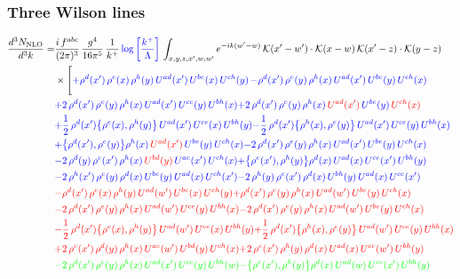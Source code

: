 \documentclass[9pt]{article}
\numberwithin{equation}{section}
\begin{document}
\subsubsection{Three Wilson lines}
\begin{align}
    \frac{d^{3}N_{\rm NLO}}{d^{3}k}= & \frac{i\,f^{abc}}{(2\pi)^{3}}\,\frac{g^{4}}{16\pi^{5}}\,\frac{1}{k^{+}}\,{\color{blue}\log{\left[\frac{k^{+}}{\Lambda}\right]}}\,\int_{x,y,z,x',w,w'}e^{-ik(w'-w)}\,\mathcal{K}(x'-w')\cdot\mathcal{K}(x-w)\,\mathcal{K}(x'-z)\cdot\mathcal{K}(y-z)\notag \\ & \times\Bigg[{\color{blue}+\rho^{d}(x')\,\rho^{e}(x)\,\rho^{h}(y)\,U^{ad}(x')\,U^{be}(x)\,U^{ch}(y)}\,{\color{blue}-\rho^{d}(x')\,\rho^{e}(y)\,\rho^{h}(x)\,U^{ad}(x')\,U^{be}(y)\,U^{ch}(x)}\notag \\ &{\color{blue}+2\,\rho^{d}(x')\,\rho^{e}(y)\,\rho^{h}(x)\,U^{ad}(x')\,U^{ce}(y)\,U^{bh}(x)}{\color{blue}+2\,\rho^{d}(x')\,\rho^{e}(y)\,\rho^{h}(x)\, {\color{red}U^{ad}(x')}\,U^{be}(y)\,{\color{red}U^{ch}(x)}}\notag \\ & {\color{blue}+\frac{1}{2}\,\rho^{d}(x')\big\{\rho^{e}(x),\rho^{h}(y)\big\}\,U^{ad}(x')\,U^{ce}(x)\,U^{bh}(y)}{\color{blue}-\frac{1}{2}\,\rho^{d}(x')\big\{\rho^{h}(x),\rho^{e}(y)\big\}\,U^{ad}(x')\,U^{ce}(y)\,U^{bh}(x)}\notag \\ & {\color{blue}+\big\{\rho^{d}(x'),\rho^{e}(y)\big\}\rho^{h}(x)\,{\color{red}U^{ad}(x')}\,U^{be}(y)\,U^{ch}(x)}{\color{blue}-2\,\rho^{d}(x')\,\rho^{e}(y)\, \rho^{h}(x)\, U^{ad}(x')\,U^{be}(y)\,U^{ch}(x)}\notag \\ &{\color{blue}-2\,\rho^{d}(y)\,\rho^{e}(x')\, \rho^{h}(x)\, {\color{red}U^{bd}(y)}\,U^{ae}(x')\,U^{ch}(x)}{\color{blue}+\big\{\rho^{e}(x'),\rho^{h}(y)\big\}\rho^{d}(x)\,U^{ad}(x)\,U^{ce}(x')\,U^{bh}(y)}\notag \\ & {\color{blue}-2\,\rho^{h}(x')\,\rho^{e}(y)\,\rho^{d}(x)\,U^{be}(y)\,U^{ad}(x)\,U^{ch}(x')}{\color{blue}-2\,\rho^{h}(y)\,\rho^{e}(x')\,\rho^{d}(x)\,U^{bh}(y)\,U^{ad}(x)\,U^{ce}(x')}\notag \\ & {\color{red}-\rho^{d}(x')\,\rho^{e}(x)\,\rho^{h}(y)\,U^{ad}(w')\,U^{be}(x)\,U^{ch}(y)}{\color{red}+\rho^{d}(x')\,\rho^{e}(y)\,\rho^{h}(x)\,U^{ad}(w')\,U^{be}(y)\,U^{ch}(x)}\notag \\ &{\color{red}-2\,\rho^{d}(x')\,\rho^{e}(y)\,\rho^{h}(x)\,U^{ad}(w')\,U^{ce}(y)\,U^{bh}(x)} {\color{red}-2\,\rho^{d}(x')\,\rho^{e}(y)\,\rho^{h}(x)\, {\color{red}U^{ad}(w')}\,U^{be}(y)\,{\color{red}U^{ch}(x)}}\notag \\ & {\color{red}-\frac{1}{2}\,\rho^{d}(x')\big\{\rho^{e}(x),\rho^{h}(y)\big\}\,U^{ad}(w')\,U^{ce}(x)\,U^{bh}(y)}{\color{red}+\frac{1}{2}\,\rho^{d}(x')\big\{\rho^{h}(x),\rho^{e}(y)\big\}\,U^{ad}(w')\,U^{ce}(y)\,U^{bh}(x)}\notag \\ & {\color{red}+2\,\rho^{e}(x')\,\rho^{d}(y)\, \rho^{h}(x)\, U^{ae}(w')\,U^{bd}(y)\,U^{ch}(x)}{\color{red}+2\,\rho^{e}(x')\,\rho^{h}(y)\,\rho^{d}(x)\,U^{ad}(x)\,U^{ce}(w')\,U^{bh}(y)}\notag \\ & {\color{green}-2\,\rho^{d}(x')\,\rho^{e}(y)\,\rho^{h}(x)\,U^{ad}(x')\,U^{ce}(y)\,U^{bh}(w)}{\color{green}-\big\{\rho^{e}(x'),\rho^{h}(y)\big\}\rho^{d}(x)\,U^{ad}(w)\,U^{ce}(x')\,U^{bh}(y)}\notag \\ & 
\end{align}
\end{document}
